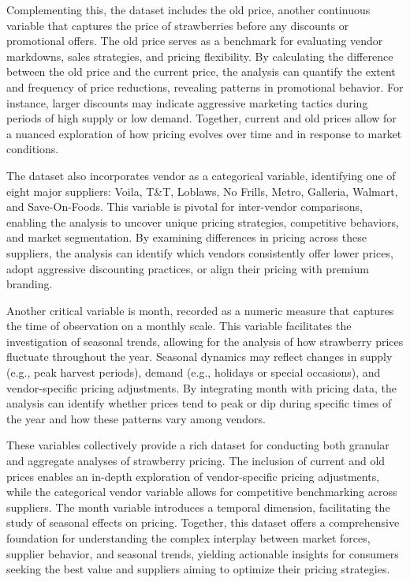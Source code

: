\documentclass[
  letterpaper,
  DIV=11,
  numbers=noendperiod]{scrartcl}
\begin{document}
Complementing this, the dataset includes the old price, another
continuous variable that captures the price of strawberries before any
discounts or promotional offers. The old price serves as a benchmark for
evaluating vendor markdowns, sales strategies, and pricing flexibility.
By calculating the difference between the old price and the current
price, the analysis can quantify the extent and frequency of price
reductions, revealing patterns in promotional behavior. For instance,
larger discounts may indicate aggressive marketing tactics during
periods of high supply or low demand. Together, current and old prices
allow for a nuanced exploration of how pricing evolves over time and in
response to market conditions.

The dataset also incorporates vendor as a categorical variable,
identifying one of eight major suppliers: Voila, T\&T, Loblaws, No
Frills, Metro, Galleria, Walmart, and Save-On-Foods. This variable is
pivotal for inter-vendor comparisons, enabling the analysis to uncover
unique pricing strategies, competitive behaviors, and market
segmentation. By examining differences in pricing across these
suppliers, the analysis can identify which vendors consistently offer
lower prices, adopt aggressive discounting practices, or align their
pricing with premium branding.

Another critical variable is month, recorded as a numeric measure that
captures the time of observation on a monthly scale. This variable
facilitates the investigation of seasonal trends, allowing for the
analysis of how strawberry prices fluctuate throughout the year.
Seasonal dynamics may reflect changes in supply (e.g., peak harvest
periods), demand (e.g., holidays or special occasions), and
vendor-specific pricing adjustments. By integrating month with pricing
data, the analysis can identify whether prices tend to peak or dip
during specific times of the year and how these patterns vary among
vendors.

These variables collectively provide a rich dataset for conducting both
granular and aggregate analyses of strawberry pricing. The inclusion of
current and old prices enables an in-depth exploration of
vendor-specific pricing adjustments, while the categorical vendor
variable allows for competitive benchmarking across suppliers. The month
variable introduces a temporal dimension, facilitating the study of
seasonal effects on pricing. Together, this dataset offers a
comprehensive foundation for understanding the complex interplay between
market forces, supplier behavior, and seasonal trends, yielding
actionable insights for consumers seeking the best value and suppliers
aiming to optimize their pricing strategies.
\end{document}
